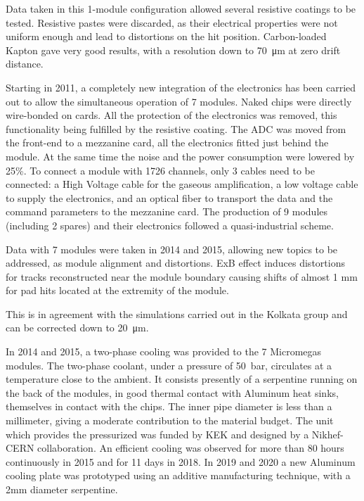 Data taken in this 1-module configuration allowed several resistive coatings to be tested. Resistive pastes were discarded, as
their electrical properties were not uniform enough and lead to distortions on the hit position. Carbon-loaded Kapton gave
very good results, with a resolution down to \SI{70}{\micro \meter} at zero drift distance.

Starting in 2011, a completely new integration of the electronics has been carried out to allow the simultaneous operation
of 7 modules. Naked chips were directly wire-bonded on cards. All the protection of the electronics was removed, this functionality
being fulfilled by the resistive coating. The ADC was moved from the front-end to a mezzanine card, all the electronics fitted just behind the module.
At the same time the noise and the power consumption were lowered by 25\%. To connect a module with 1726 channels, only
3 cables need to be connected: a High Voltage cable for the gaseous amplification, a low voltage cable to supply the electronics,
and an optical fiber to transport the data and the command parameters to the mezzanine card.
The production of 9 modules (including 2 spares) and their electronics followed a quasi-industrial scheme.

Data with 7 modules were taken in 2014 and 2015, allowing new topics to be addressed, as module alignment and distortions.
ExB effect induces distortions for tracks reconstructed near the module boundary causing
shifts of almost 1 mm for pad hits located at the extremity of the module.


This is
in agreement with the simulations carried out in the Kolkata group and can be corrected down to \SI{20}{\micro \meter}.

In 2014 and 2015, a two-phase  cooling was provided to the 7 Micromegas modules. The two-phase coolant, under a pressure of \SI{50}{bar}, circulates at a temperature close to the ambient.
It consists presently of a serpentine running on the back of the modules, in good thermal contact with Aluminum heat sinks, themselves in contact with the chips. The inner pipe diameter is less than a millimeter, giving a moderate contribution to the material budget. The unit
which provides the pressurized  was funded by KEK and designed by a Nikhef-CERN collaboration.
An efficient cooling was observed for more than 80 hours continuously in 2015 and for 11 days in 2018. In 2019 and 2020 a new Aluminum cooling plate was prototyped using an additive manufacturing technique, with a 2mm diameter serpentine. 

